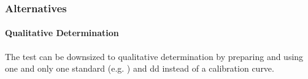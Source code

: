 \subsubsection{Alternatives}
\paragraph{Qualitative Determination}
The test can be downsized to qualitative determination by preparing and using one and only one standard (e.g. ) and dd instead of a calibration curve.

